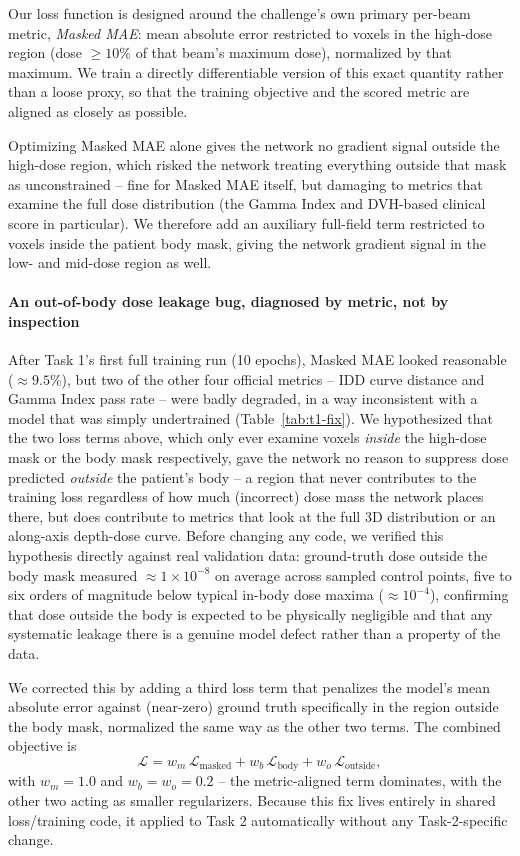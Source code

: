 \documentclass[10pt,conference]{IEEEtran}
\begin{document}
Our loss function is designed around the challenge's own primary
per-beam metric, \emph{Masked MAE}: mean absolute error restricted to
voxels in the high-dose region (dose $\geq 10\%$ of that beam's maximum
dose), normalized by that maximum. We train a directly differentiable
version of this exact quantity rather than a loose proxy, so that the
training objective and the scored metric are aligned as closely as
possible.

Optimizing Masked MAE alone gives the network no gradient signal outside
the high-dose region, which risked the network treating everything
outside that mask as unconstrained -- fine for Masked MAE itself, but
damaging to metrics that examine the full dose distribution (the Gamma
Index and DVH-based clinical score in particular). We therefore add an
auxiliary full-field term restricted to voxels inside the patient body
mask, giving the network gradient signal in the low- and mid-dose region
as well.

\paragraph{An out-of-body dose leakage bug, diagnosed by metric, not by inspection}
After Task 1's first full training run (10 epochs), Masked MAE looked
reasonable ($\approx 9.5\%$), but two of the other four official
metrics -- IDD curve distance and Gamma Index pass rate -- were badly
degraded, in a way inconsistent with a model that was simply
undertrained (Table~\ref{tab:t1-fix}). We hypothesized that the two loss
terms above, which only ever examine voxels \emph{inside} the high-dose
mask or the body mask respectively, gave the network no reason to
suppress dose predicted \emph{outside} the patient's body -- a region
that never contributes to the training loss regardless of how much
(incorrect) dose mass the network places there, but does contribute to
metrics that look at the full 3D distribution or an along-axis
depth-dose curve. Before changing any code, we verified this hypothesis
directly against real validation data: ground-truth dose outside the
body mask measured $\approx 1\times10^{-8}$ on average across sampled
control points, five to six orders of magnitude below typical in-body
dose maxima ($\approx 10^{-4}$), confirming that dose outside the body
is expected to be physically negligible and that any systematic leakage
there is a genuine model defect rather than a property of the data.

We corrected this by adding a third loss term that penalizes the
model's mean absolute error against (near-zero) ground truth
specifically in the region outside the body mask, normalized the same
way as the other two terms. The combined objective is
\begin{equation}
    \mathcal{L} = w_m \, \mathcal{L}_{\text{masked}}
                + w_b \, \mathcal{L}_{\text{body}}
                + w_o \, \mathcal{L}_{\text{outside}},
\end{equation}
with $w_m = 1.0$ and $w_b = w_o = 0.2$ -- the metric-aligned term
dominates, with the other two acting as smaller regularizers. Because
this fix lives entirely in shared loss/training code, it applied to
Task 2 automatically without any Task-2-specific change.
\end{document}
